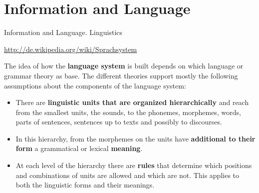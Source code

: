 \documentclass{beamer}
\newcommand{\ueberschrift}[1]{\begin{center}\bf #1\end{center}}
\begin{document}
\section{Information and Language}


\begin{frame}{Information and Language. Linguistics}\small
  
\url{http://de.wikipedia.org/wiki/Sprachsystem}

The idea of how the \textbf{language system} is built depends on which
language or grammar theory as base. The different theories support mostly the
following assumptions about the components of the language system:
\begin{itemize}
\item There are \textbf{linguistic units that are organized hierarchically}
  and reach from the smallest units, the sounds, to the phonemes, morphemes,
  words, parts of sentences, sentences up to texts and possibly to discourses.
\item In this hierarchy, from the morphemes on the units have
  \textbf{additional to their form} a grammatical or lexical \textbf{meaning}.
\item At each level of the hierarchy there are \textbf{rules} that determine
  which positions and combinations of units are allowed and which are not.
  This applies to both the linguistic forms and their meanings.
\end{itemize}
\end{frame}
\end{document}
